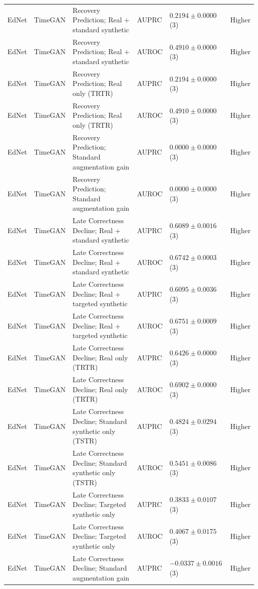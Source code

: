 \begin{longtable}{@{}p{2.25cm}p{2.05cm}p{4.7cm}p{5.0cm}p{2.6cm}p{1.25cm}@{}}
EdNet & TimeGAN & Recovery Prediction; Real + standard synthetic & AUPRC & $0.2194 \mathbin{\pm} 0.0000$ (3) & Higher \\
EdNet & TimeGAN & Recovery Prediction; Real + standard synthetic & AUROC & $0.4910 \mathbin{\pm} 0.0000$ (3) & Higher \\
EdNet & TimeGAN & Recovery Prediction; Real only (TRTR) & AUPRC & $0.2194 \mathbin{\pm} 0.0000$ (3) & Higher \\
EdNet & TimeGAN & Recovery Prediction; Real only (TRTR) & AUROC & $0.4910 \mathbin{\pm} 0.0000$ (3) & Higher \\
EdNet & TimeGAN & Recovery Prediction; Standard augmentation gain & AUPRC & $0.0000 \mathbin{\pm} 0.0000$ (3) & Higher \\
EdNet & TimeGAN & Recovery Prediction; Standard augmentation gain & AUROC & $0.0000 \mathbin{\pm} 0.0000$ (3) & Higher \\
EdNet & TimeGAN & Late Correctness Decline; Real + standard synthetic & AUPRC & $0.6089 \mathbin{\pm} 0.0016$ (3) & Higher \\
EdNet & TimeGAN & Late Correctness Decline; Real + standard synthetic & AUROC & $0.6742 \mathbin{\pm} 0.0003$ (3) & Higher \\
EdNet & TimeGAN & Late Correctness Decline; Real + targeted synthetic & AUPRC & $0.6095 \mathbin{\pm} 0.0036$ (3) & Higher \\
EdNet & TimeGAN & Late Correctness Decline; Real + targeted synthetic & AUROC & $0.6751 \mathbin{\pm} 0.0009$ (3) & Higher \\
EdNet & TimeGAN & Late Correctness Decline; Real only (TRTR) & AUPRC & $0.6426 \mathbin{\pm} 0.0000$ (3) & Higher \\
EdNet & TimeGAN & Late Correctness Decline; Real only (TRTR) & AUROC & $0.6902 \mathbin{\pm} 0.0000$ (3) & Higher \\
EdNet & TimeGAN & Late Correctness Decline; Standard synthetic only (TSTR) & AUPRC & $0.4824 \mathbin{\pm} 0.0294$ (3) & Higher \\
EdNet & TimeGAN & Late Correctness Decline; Standard synthetic only (TSTR) & AUROC & $0.5451 \mathbin{\pm} 0.0086$ (3) & Higher \\
EdNet & TimeGAN & Late Correctness Decline; Targeted synthetic only & AUPRC & $0.3833 \mathbin{\pm} 0.0107$ (3) & Higher \\
EdNet & TimeGAN & Late Correctness Decline; Targeted synthetic only & AUROC & $0.4067 \mathbin{\pm} 0.0175$ (3) & Higher \\
EdNet & TimeGAN & Late Correctness Decline; Standard augmentation gain & AUPRC & $-0.0337 \mathbin{\pm} 0.0016$ (3) & Higher \\

\end{longtable}
